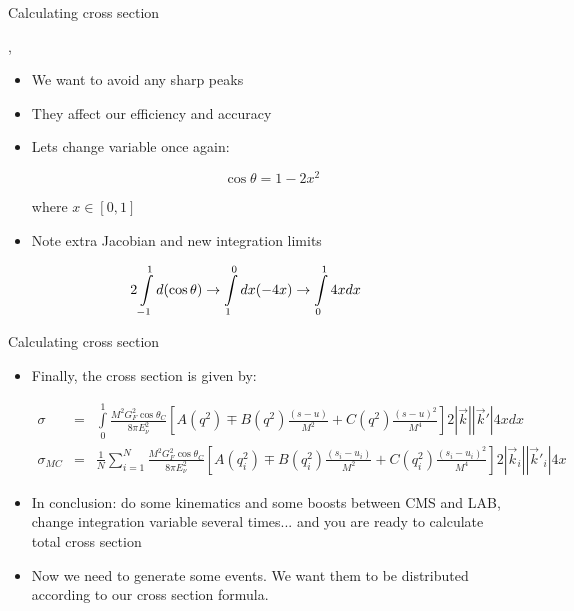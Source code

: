 \begin{slide}[toc=]{Calculating cross section}
\null\vfill

  \twocolumn
  {
    \sep
    \begin{itemize}
      \item We want to avoid any sharp peaks
      \item They affect our efficiency and accuracy
      \item Lets change variable once again:
      
      $$\cos\theta = 1 - 2x^2$$
     
      where $x\in[0,1]$
      
      \item Note extra Jacobian and new integration limits
      
    \end{itemize}
    
    \vspace{-20pt}$$\hspace*{-20pt}2\int\limits_{-1}^1 d(\cos\theta) \rightarrow \int\limits_1^0 dx (-4x) \rightarrow \int\limits_0^1 4xdx$$
  }
  {
    
    \vspace{-10pt}
    
  }
  
\vfill\null
\end{slide}

\begin{wideslide}[toc=]{Calculating cross section}
\null\vfill

  \begin{itemize}
    
    \item Finally, the cross section is given by:
    
    {\small
    \begin{eqnarray*}
      \sigma      & = & \int\limits_{0}^{1} \frac{M^2G_F^2\cos\theta_C}{8\pi E_\nu^2}\left[A(q^2) \mp B(q^2)\frac{(s - u)}{M^2} + C(q^2)\frac{(s - u)^2}{M^4}\right]2|\vec k||\vec k'|4xdx \\
      \sigma_{MC} & = & \frac{1}{N}\sum\limits_{i = 1}^N \frac{M^2G_F^2\cos\theta_C}{8\pi E_\nu^2}\left[A(q_i^2) \mp B(q_i^2)\frac{(s_i - u_i)}{M^2} + C(q_i^2)\frac{(s_i - u_i)^2}{M^4}\right]2|\vec k_i||\vec k'_i|4x
    \end{eqnarray*}
    }
    
    \item In conclusion: do some kinematics and some boosts between CMS and LAB, change integration variable several times... and you are ready to calculate total cross section
    
    \item Now we need to generate some events. We want them to be distributed according to our cross section formula.
      
  \end{itemize}

\vfill\null
\end{wideslide}

